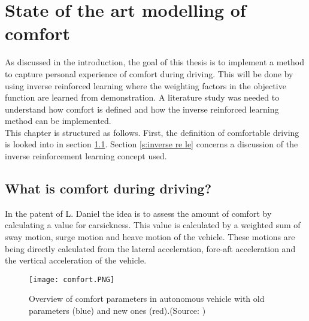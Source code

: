 \chapter{State of the art modelling of comfort}
\label{cha:Literature_study}
As discussed in the introduction, the goal of this thesis is to implement a method to capture personal experience of comfort during driving. This will be done by using inverse reinforced learning where the weighting factors in the objective function are learned from demonstration. A literature study was needed to understand how comfort is defined and how the inverse reinforced learning method can be implemented.\\

This chapter is structured as follows. First, the definition of comfortable driving is looked into in section \ref{s:comfort_parameters}. Section \ref{s:inverse re le} concerns a discussion of the inverse reinforcement learning concept used.

\section{What is comfort during driving?}
\label{s:comfort_parameters}
In the patent of L. Daniel \cite{Daniel2018} the idea is to assess the amount of comfort by calculating a value for carsickness. This value is calculated by a weighted sum of sway motion, surge motion and heave motion of the vehicle. These motions are being directly calculated from the lateral acceleration, fore-aft acceleration and the vertical acceleration of the vehicle. \\

\begin{figure}[h!]
	\centering
	\texttt{[image: comfort.PNG]}
	\caption{Overview of comfort parameters in autonomous vehicle with old parameters (blue) and new ones (red).(Source: \cite{Elbanhawi2015})}
	\label{fig:Comfort}
\end{figure} 

